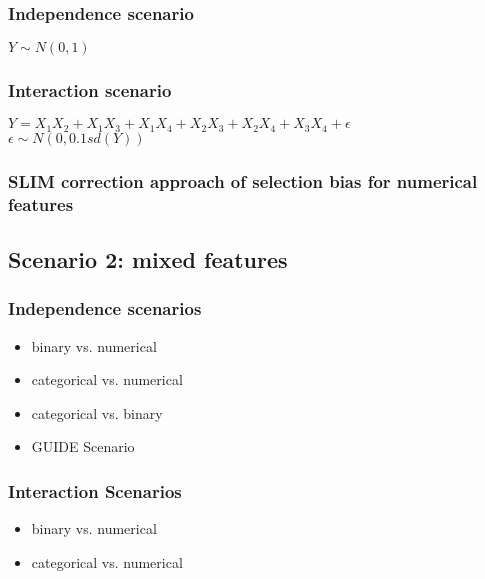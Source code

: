 \subsubsection{Independence scenario}
$Y \sim N(0,1)$
\subsubsection{Interaction scenario}
$Y = X_1X_2 + X_1X_3 + X_1X_4 + X_2X_3 + X_2X_4 + X_3X_4 + \epsilon$ \\
$\epsilon \sim N(0,0.1sd(Y))$


\subsubsection{SLIM correction approach of selection bias for numerical features}

\subsection{Scenario 2: mixed features}
\subsubsection{Independence scenarios}
\begin{itemize}
    \item binary vs. numerical
    \item categorical vs. numerical
    \item categorical vs. binary
    \item GUIDE Scenario
\end{itemize}

\subsubsection{Interaction Scenarios}
\begin{itemize}
    \item binary vs. numerical
    \item categorical vs. numerical
\end{itemize}



